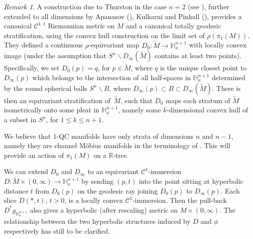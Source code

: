 \documentclass[JEP,XML,SOM,Unicode]{cedram}
\let\mathcal\mathscr
\let\moins\smallsetminus
\theoremstyle{definition}
\theoremstyle{remark}
\newtheorem{remark}[theorem]{Remark}
\numberwithin{equation}{section}
\newcommand{\RR}{\mathbb R}
\begin{document}
\begin{remark}
A construction due to Thurston in the case $n=2$ (see \cite{KT}), further extended to all dimensions by
Apanasov (\cite{A}), Kulkarni and Pinkall (\cite{KP}), provides a canonical $\mathcal C^{1,1}$ Riemannian
metric on $M$ and a canonical totally geodesic stratification, using the convex hull construction on the limit set of $\rho(\pi_1(M))$. They defined a continuous
$\rho$-equivariant map $D_0: \widetilde{M}\to \mathbb H^{n+1}_{\kappa}$ with locally convex image (under the assumption that $S^n\moins D_{\infty}(\widetilde{M})$ contains at least two points).
Specifically, we set $D_0(p)=q$, for $p\in \widetilde{M}$, where $q$ is the unique closest point
to $D_{\infty}(p)$ which belongs to the intersection of all half-spaces in $\mathbb H^{n+1}_{\kappa}$
determined by the round spherical balls $S^n\moins B$, where $D_{\infty}(p)\subset B \subset D_{\infty}(\widetilde{M})$.
There is then an equivariant stratification of~$\widetilde{M}$, such that $D_0$ maps each stratum of $\widetilde{M}$
isometrically onto some pleat in $\mathbb H^{n+1}_{\kappa}$, namely some $k$-dimensional
convex hull of a subset in $S^n$, for $1\leq k \leq n+1$.

We believe that $1$-QC manifolds have only strata of dimensions $n$ and $n-1$, namely they are channel
Möbius manifolds in the terminology of \cite{KP}. This will provide an action of $\pi_1(M)$ on a $\RR$-tree.

We can extend $D_0$ and $D_{\infty}$ to an equivariant $\mathcal C^1$-immersion $D:\widetilde{M}\times (0,\infty)\to \mathbb H_{\kappa}^{n+1}$ by sending $(p,t)$ into the point sitting at hyperbolic distance $t$ from $D_0(p)$ on the geodesic ray joining $D_0(p)$ to
$D_{\infty}(p)$. Each slice $D(*, t)$, $t>0$, is a locally convex $\mathcal C^1$-immersion.
Then the pull-back $D^*g_{\mathbb H^{n+1}_{\kappa}}$ also gives a hyperbolic (after rescaling) metric on
$M\times (0,\infty)$. The relationship between the two hyperbolic structures induced by $D$ and $\phi$
respectively has still to be clarified.
\end{remark}
\end{document}

